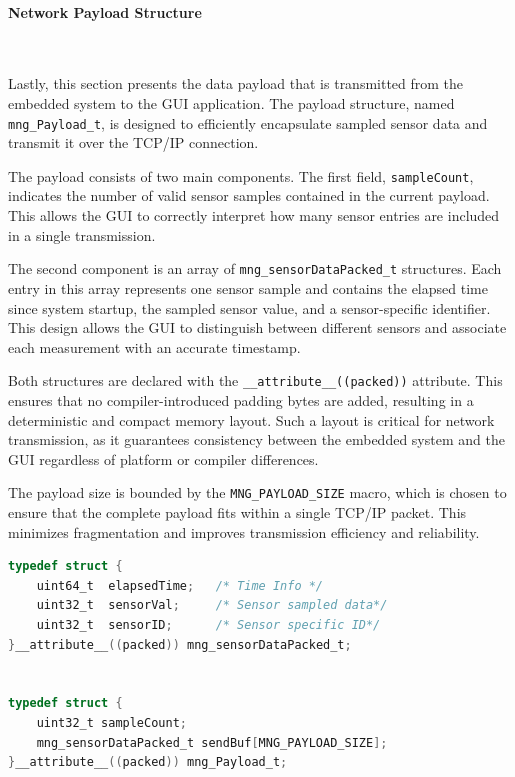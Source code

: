\documentclass{article}
\begin{document}
\paragraph{Network Payload Structure}\

Lastly, this section presents the data payload that is transmitted from the embedded 
system to the GUI application. The payload structure, named \texttt{mng\_Payload\_t}, 
is designed to efficiently encapsulate sampled sensor data and transmit it over the 
TCP/IP connection.

The payload consists of two main components. The first field, \texttt{sampleCount}, 
indicates the number of valid sensor samples contained in the current payload. This 
allows the GUI to correctly interpret how many sensor entries are included in a single 
transmission.

The second component is an array of \texttt{mng\_sensorDataPacked\_t} structures. Each 
entry in this array represents one sensor sample and contains the elapsed time since 
system startup, the sampled sensor value, and a sensor-specific identifier. This design 
allows the GUI to distinguish between different sensors and associate each measurement 
with an accurate timestamp.

Both structures are declared with the \texttt{\_\_attribute\_\_((packed))} attribute. 
This ensures that no compiler-introduced padding bytes are added, resulting in a 
deterministic and compact memory layout. Such a layout is critical for network 
transmission, as it guarantees consistency between the embedded system and the GUI 
regardless of platform or compiler differences.

The payload size is bounded by the \texttt{MNG\_PAYLOAD\_SIZE} macro, which is chosen 
to ensure that the complete payload fits within a single TCP/IP packet. This minimizes 
fragmentation and improves transmission efficiency and reliability.

\begin{lstlisting}[language=C,
caption={Network Payload Structures},
label={lst:payloads}]
typedef struct {
    uint64_t  elapsedTime;   /* Time Info */
    uint32_t  sensorVal;     /* Sensor sampled data*/
    uint32_t  sensorID;      /* Sensor specific ID*/
}__attribute__((packed)) mng_sensorDataPacked_t;


typedef struct {
    uint32_t sampleCount;
    mng_sensorDataPacked_t sendBuf[MNG_PAYLOAD_SIZE];
}__attribute__((packed)) mng_Payload_t;
\end{lstlisting}
\end{document}
